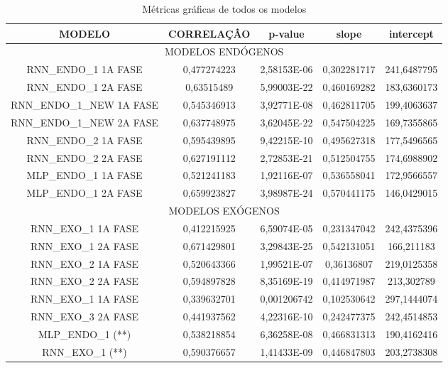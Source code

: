 \begin{table}[!ht]
        \caption{Métricas gráficas de todos os modelos}
        \begin{adjustbox}{width=\columnwidth,center}
           \begin{tabular}{ | c | c| c | c| c |}
     \rowcolor{gray!50}
   {	MODELO} & CORRELAÇÂO &	p-value &	slope & 	intercept\\ \hline
     \multicolumn{5}{c}{	MODELOS ENDÓGENOS }  \\ \hline
RNN\_ENDO\_1 1A FASE &	0,477274223	&2,58153E-06&	0,302281717&241,6487795 \\ \hline
RNN\_ENDO\_1 2A FASE&	0,63515489&	5,99003E-22&	0,460169282&	183,6360173\\ \hline
RNN\_ENDO\_1\_NEW 1A FASE&	0,545346913	&3,92771E-08&	0,462811705&	199,4063637\\ \hline
RNN\_ENDO\_1\_NEW 2A FASE&	0,637748975&	3,62045E-22	&0,547504225&	169,7355865\\ \hline
RNN\_ENDO\_2 1A FASE&	0,595439895&	9,42215E-10	&0,495627318&	177,5496565\\ \hline
RNN\_ENDO\_2 2A FASE&	0,627191112&2,72853E-21&	0,512504755	&174,6988902\\ \hline
MLP\_ENDO\_1 1A FASE&	0,521241183	&1,92116E-07&	0,536558041	&172,9566557\\ \hline
MLP\_ENDO\_1 2A FASE&	0,659923827	&3,98987E-24&	0,570441175&	146,0429015\\ \hline
	\multicolumn{5}{c}{ MODELOS EXÓGENOS }\\ \hline
RNN\_EXO\_1 1A FASE &	0,412215925&	6,59074E-05&	0,231347042&	242,4375396 \\ \hline
RNN\_EXO\_1 2A FASE &	0,671429801	&3,29843E-25&	0,542131051&	166,211183 \\ \hline
RNN\_EXO\_2 1A FASE&	0,520643366	&1,99521E-07&	0,36136807&	219,0125358 \\ \hline
RNN\_EXO\_2 2A FASE&	0,594897828&8,35169E-19&	0,414971987&	213,302789 \\ \hline
RNN\_EXO\_1 1A FASE&	0,339632701&	0,001206742	&0,102530642&	297,1444074 \\ \hline
RNN\_EXO\_3 2A FASE&	0,441937562&	4,22316E-10&	0,242477375	&242,4514853 \\ \hline
MLP\_ENDO\_1 (**)&	0,538218854	&6,36258E-08&	0,466831313&190,4162416 \\ \hline
RNN\_EXO\_1  (**)&	0,590376657	&1,41433E-09&	0,446847803	&203,2738308 \\ \hline
\end{tabular} \end{adjustbox} \end{table} 



